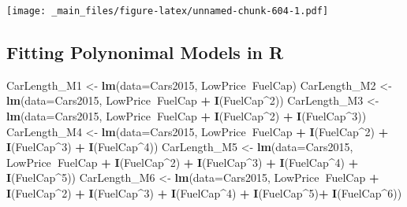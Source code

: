 \documentclass[]{book}
\newenvironment{Shaded}{\begin{snugshade}}{\end{snugshade}}
\newcommand{\KeywordTok}[1]{\textcolor[rgb]{0.13,0.29,0.53}{\textbf{#1}}}
\newcommand{\DataTypeTok}[1]{\textcolor[rgb]{0.13,0.29,0.53}{#1}}
\newcommand{\DecValTok}[1]{\textcolor[rgb]{0.00,0.00,0.81}{#1}}
\newcommand{\StringTok}[1]{\textcolor[rgb]{0.31,0.60,0.02}{#1}}
\newcommand{\OperatorTok}[1]{\textcolor[rgb]{0.81,0.36,0.00}{\textbf{#1}}}
\newcommand{\NormalTok}[1]{#1}
\begin{document}
\texttt{[image: \_main\_files/figure-latex/unnamed-chunk-604-1.pdf]}

\subsection{Fitting Polynonimal Models in
R}\label{fitting-polynonimal-models-in-r}

\begin{Shaded}
\begin{Highlighting}[]
\NormalTok{CarLength_M1 <-}\StringTok{ }\KeywordTok{lm}\NormalTok{(}\DataTypeTok{data=}\NormalTok{Cars2015, LowPrice}\OperatorTok{~}\NormalTok{FuelCap)}
\NormalTok{CarLength_M2 <-}\StringTok{ }\KeywordTok{lm}\NormalTok{(}\DataTypeTok{data=}\NormalTok{Cars2015, LowPrice}\OperatorTok{~}\NormalTok{FuelCap }\OperatorTok{+}\StringTok{ }\KeywordTok{I}\NormalTok{(FuelCap}\OperatorTok{^}\DecValTok{2}\NormalTok{))}
\NormalTok{CarLength_M3 <-}\StringTok{ }\KeywordTok{lm}\NormalTok{(}\DataTypeTok{data=}\NormalTok{Cars2015, LowPrice}\OperatorTok{~}\NormalTok{FuelCap }\OperatorTok{+}\StringTok{ }\KeywordTok{I}\NormalTok{(FuelCap}\OperatorTok{^}\DecValTok{2}\NormalTok{) }\OperatorTok{+}\StringTok{ }\KeywordTok{I}\NormalTok{(FuelCap}\OperatorTok{^}\DecValTok{3}\NormalTok{))}
\NormalTok{CarLength_M4 <-}\StringTok{ }\KeywordTok{lm}\NormalTok{(}\DataTypeTok{data=}\NormalTok{Cars2015, LowPrice}\OperatorTok{~}\NormalTok{FuelCap }\OperatorTok{+}\StringTok{ }\KeywordTok{I}\NormalTok{(FuelCap}\OperatorTok{^}\DecValTok{2}\NormalTok{) }\OperatorTok{+}\StringTok{ }\KeywordTok{I}\NormalTok{(FuelCap}\OperatorTok{^}\DecValTok{3}\NormalTok{) }\OperatorTok{+}\StringTok{ }\KeywordTok{I}\NormalTok{(FuelCap}\OperatorTok{^}\DecValTok{4}\NormalTok{))}
\NormalTok{CarLength_M5 <-}\StringTok{ }\KeywordTok{lm}\NormalTok{(}\DataTypeTok{data=}\NormalTok{Cars2015, LowPrice}\OperatorTok{~}\NormalTok{FuelCap }\OperatorTok{+}\StringTok{ }\KeywordTok{I}\NormalTok{(FuelCap}\OperatorTok{^}\DecValTok{2}\NormalTok{) }\OperatorTok{+}\StringTok{ }\KeywordTok{I}\NormalTok{(FuelCap}\OperatorTok{^}\DecValTok{3}\NormalTok{) }\OperatorTok{+}\StringTok{ }\KeywordTok{I}\NormalTok{(FuelCap}\OperatorTok{^}\DecValTok{4}\NormalTok{) }\OperatorTok{+}\StringTok{ }
\StringTok{                     }\KeywordTok{I}\NormalTok{(FuelCap}\OperatorTok{^}\DecValTok{5}\NormalTok{))}
\NormalTok{CarLength_M6 <-}\StringTok{ }\KeywordTok{lm}\NormalTok{(}\DataTypeTok{data=}\NormalTok{Cars2015, LowPrice}\OperatorTok{~}\NormalTok{FuelCap }\OperatorTok{+}\StringTok{ }\KeywordTok{I}\NormalTok{(FuelCap}\OperatorTok{^}\DecValTok{2}\NormalTok{) }\OperatorTok{+}\StringTok{ }\KeywordTok{I}\NormalTok{(FuelCap}\OperatorTok{^}\DecValTok{3}\NormalTok{) }\OperatorTok{+}\StringTok{ }\KeywordTok{I}\NormalTok{(FuelCap}\OperatorTok{^}\DecValTok{4}\NormalTok{) }\OperatorTok{+}\StringTok{ }
\StringTok{                     }\KeywordTok{I}\NormalTok{(FuelCap}\OperatorTok{^}\DecValTok{5}\NormalTok{)}\OperatorTok{+}\StringTok{ }\KeywordTok{I}\NormalTok{(FuelCap}\OperatorTok{^}\DecValTok{6}\NormalTok{))}
\end{Highlighting}
\end{Shaded}
\end{document}
